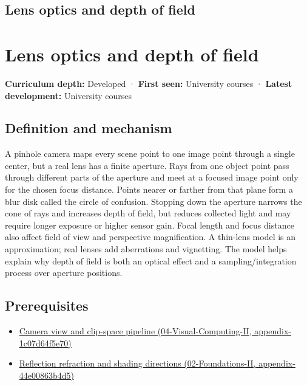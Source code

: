 \hypertarget{appendix-21f8456e2629}{}
\section*{Lens optics and depth of field}
\chapter{Lens optics and depth of field}\label{appendix-21f8456e2629-lens-optics-and-depth-of-field}

\textbf{Curriculum depth:} Developed · \textbf{First seen:} University courses · \textbf{Latest development:} University courses

\section{Definition and mechanism}\label{appendix-21f8456e2629-definition-and-mechanism}

A pinhole camera maps every scene point to one image point through a single center, but a real lens has a finite aperture. Rays from one object point pass through different parts of the aperture and meet at a focused image point only for the chosen focus distance. Points nearer or farther from that plane form a blur disk called the circle of confusion. Stopping down the aperture narrows the cone of rays and increases depth of field, but reduces collected light and may require longer exposure or higher sensor gain. Focal length and focus distance also affect field of view and perspective magnification. A thin-lens model is an approximation; real lenses add aberrations and vignetting. The model helps explain why depth of field is both an optical effect and a sampling/integration process over aperture positions.

\section{Prerequisites}\label{appendix-21f8456e2629-prerequisites}

\begin{itemize}
\tightlist
\item
  \href{../04-Visual-Computing-II/main.pdf\#nameddest=appendix-1c07d64f5e70}{Camera view and clip-space pipeline (04-Visual-Computing-II, appendix-1c07d64f5e70)}
\item
  \href{../02-Foundations-II/main.pdf\#nameddest=appendix-44e00863b4d5}{Reflection refraction and shading directions (02-Foundations-II, appendix-44e00863b4d5)}
\end{itemize}

